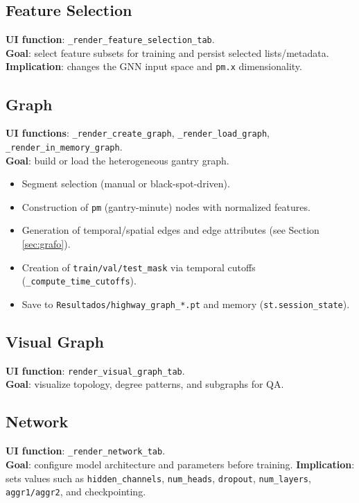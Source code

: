\subsection{Feature Selection}
\textbf{UI function}: \texttt{\_render\_feature\_selection\_tab}.\\
\textbf{Goal}: select feature subsets for training and persist selected lists/metadata.
\textbf{Implication}: changes the GNN input space and \texttt{pm.x} dimensionality.

\subsection{Graph}
\textbf{UI functions}: \texttt{\_render\_create\_graph}, \texttt{\_render\_load\_graph}, \texttt{\_render\_in\_memory\_graph}.\\
\textbf{Goal}: build or load the heterogeneous gantry graph.
\begin{itemize}[leftmargin=*]
  \item Segment selection (manual or black-spot-driven).
  \item Construction of \texttt{pm} (gantry-minute) nodes with normalized features.
  \item Generation of temporal/spatial edges and edge attributes (see Section \ref{sec:grafo}).
  \item Creation of \texttt{train/val/test\_mask} via temporal cutoffs (\texttt{\_compute\_time\_cutoffs}).
  \item Save to \texttt{Resultados/highway\_graph\_*.pt} and memory (\texttt{st.session\_state}).
\end{itemize}

\subsection{Visual Graph}
\textbf{UI function}: \texttt{render\_visual\_graph\_tab}.\\
\textbf{Goal}: visualize topology, degree patterns, and subgraphs for QA.

\subsection{Network}
\textbf{UI function}: \texttt{\_render\_network\_tab}.\\
\textbf{Goal}: configure model architecture and parameters before training.
\textbf{Implication}: sets values such as \texttt{hidden\_channels}, \texttt{num\_heads}, \texttt{dropout}, \texttt{num\_layers}, \texttt{aggr1/aggr2}, and checkpointing.

